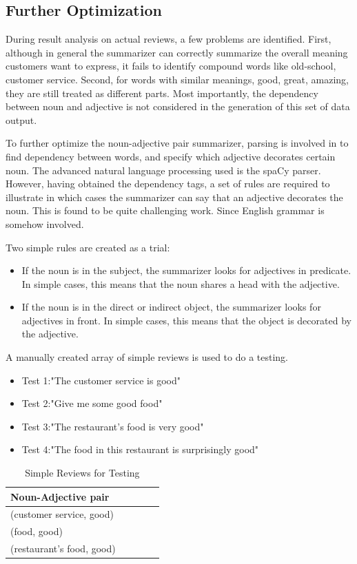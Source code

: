 \documentclass[sigconf]{acmart}
\begin{document}
\subsection{Further Optimization}

During result analysis on actual reviews, a few problems are identified. First, although in general the summarizer can correctly summarize the overall meaning customers want to express, it fails to identify compound words like old-school, customer service. Second, for words with similar meanings, good, great, amazing, they are still treated as different parts. Most importantly, the dependency between noun and adjective is not considered in the generation of this set of data output. 

To further optimize the noun-adjective pair summarizer, parsing is involved in to find dependency between words, and specify which adjective decorates certain noun. The advanced natural language processing used is the spaCy parser. However, having obtained the dependency tags, a set of rules are required to illustrate in which cases the summarizer can say that an adjective decorates the noun. This is found to be quite challenging work. Since English grammar is somehow involved. 

Two simple rules are created as a trial:
\begin{itemize}
\item If the noun is in the subject, the summarizer looks for adjectives in predicate. In simple cases, this means that the noun shares a head with the adjective. 
\item If the noun is in the direct or indirect object, the summarizer looks for adjectives in front. In simple cases, this means that the object is decorated by the adjective. 
\end{itemize}

A manually created array of simple reviews is used to do a testing. 
\begin{itemize}
\item{Test 1}:"The customer service is good"
\item{Test 2}:"Give me some good food"
\item{Test 3}:"The restaurant's food is very good"
\item{Test 4}:"The food in this restaurant is surprisingly good"
\end{itemize}

\begin{table}
  \caption{Simple Reviews for Testing}
  \label{tab:n_adj_test}
  \begin{tabular}{lllll}
    \toprule
    Noun-Adjective pair\\
    \midrule
    (customer service, good)\\
    (food, good)\\
    (restaurant's food, good)\\
\end{tabular}
\end{table}
\end{document}
